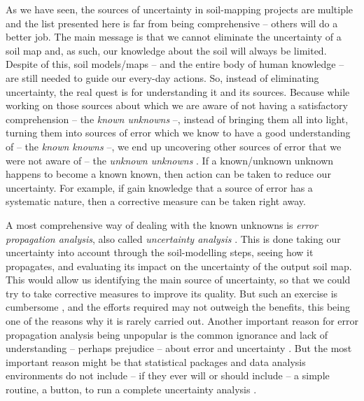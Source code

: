 As we have seen, the sources of uncertainty in soil-mapping projects are multiple and the list 
presented here is far from being comprehensive -- others will do a better job. The main message
is that we cannot eliminate the uncertainty of a soil map and, as such, our knowledge about the 
soil will always be limited. Despite of this, soil models/maps -- and the entire body of human 
knowledge -- are still needed to guide our every-day actions. So, instead of eliminating uncertainty, 
the real quest is for understanding it and its sources. Because while working on those sources about 
which we are aware of not having a satisfactory comprehension -- the \textit{known unknowns} --, 
instead of bringing them all into light, turning them into sources of error which we know to have a 
good understanding of -- the \textit{known knowns} --, we end up uncovering other sources of error 
that we were not aware of -- the \textit{unknown unknowns} \citep{Wikipedia2015}. If a 
known/unknown unknown happens to become a known known, then action can be taken to reduce 
our uncertainty. For example, if gain knowledge that a source of error has a systematic nature, 
then a corrective measure can be taken right away.

A most comprehensive way of dealing with the known unknowns is \textit{error propagation analysis}, 
also called \textit{uncertainty analysis} \citep{HeuvelinkEtAl1989, Taylor1997}. This is done taking
our uncertainty into account through the soil-modelling steps, seeing how it propagates, and 
evaluating its impact on the uncertainty of the output soil map. This would allow us identifying the
main source of uncertainty, so that we could try to take corrective measures to improve its quality.
But such an exercise is cumbersome \citep{NelsonEtAl2011}, and the efforts required may not
outweigh the benefits, this being one of the reasons why it is rarely carried out. Another important 
reason for error propagation analysis being unpopular is the common ignorance and lack of 
understanding -- perhaps prejudice -- about error and uncertainty \citep{Wechsler2003, Heuvelink2005}.
But the most important reason might be that statistical packages and data analysis environments do 
not include -- if they ever will or should include -- a simple routine, a button, to run a complete 
uncertainty analysis \citep{HeuvelinkEtAl2006b}.




